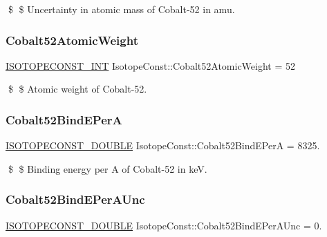 \$ \$ Uncertainty in atomic mass of Cobalt-\/52 in amu. \mbox{\label{group___isotope_const-_cobalt-_co52_ga899610b95c3026bd2833acf730c4349d}} 
\subsubsection{\texorpdfstring{Cobalt52\+Atomic\+Weight}{Cobalt52AtomicWeight}}
{\footnotesize\ttfamily \mbox{\hyperlink{group___isotope_const-_macros_ga5f18360b3e99483a35c32d789e62621c}{I\+S\+O\+T\+O\+P\+E\+C\+O\+N\+S\+T\+\_\+\+I\+NT}} Isotope\+Const\+::\+Cobalt52\+Atomic\+Weight = 52}

\$ \$ Atomic weight of Cobalt-\/52. \mbox{\label{group___isotope_const-_cobalt-_co52_ga8c8353af4114ddcedf39d05a27a2fcf2}} 
\subsubsection{\texorpdfstring{Cobalt52\+Bind\+E\+PerA}{Cobalt52BindEPerA}}
{\footnotesize\ttfamily \mbox{\hyperlink{group___isotope_const-_macros_ga8f45a7272ce02c0b4c65c44636ed719a}{I\+S\+O\+T\+O\+P\+E\+C\+O\+N\+S\+T\+\_\+\+D\+O\+U\+B\+LE}} Isotope\+Const\+::\+Cobalt52\+Bind\+E\+PerA = 8325.}

\$ \$ Binding energy per A of Cobalt-\/52 in keV. \mbox{\label{group___isotope_const-_cobalt-_co52_gaf20f975139ed474c3971814992c43cea}} 
\subsubsection{\texorpdfstring{Cobalt52\+Bind\+E\+Per\+A\+Unc}{Cobalt52BindEPerAUnc}}
{\footnotesize\ttfamily \mbox{\hyperlink{group___isotope_const-_macros_ga8f45a7272ce02c0b4c65c44636ed719a}{I\+S\+O\+T\+O\+P\+E\+C\+O\+N\+S\+T\+\_\+\+D\+O\+U\+B\+LE}} Isotope\+Const\+::\+Cobalt52\+Bind\+E\+Per\+A\+Unc = 0.}

